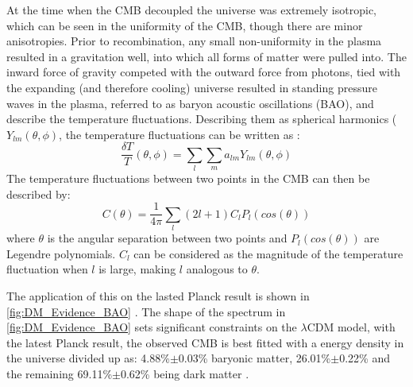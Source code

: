 \par
At the time when the CMB decoupled the universe was extremely isotropic, which can be seen in the uniformity of the CMB, though there are minor anisotropies.
Prior to recombination, any small non-uniformity in the plasma resulted in a gravitation well, into which all forms of matter were pulled into.
The inward force of gravity competed with the outward force from photons, tied with the expanding (and therefore cooling) universe resulted in standing pressure waves in the plasma, referred to as baryon acoustic oscillations (BAO), and describe the temperature fluctuations.
Describing them as spherical harmonics ($Y_{lm}(\theta,\phi)$, the temperature fluctuations can be written as \cite{History_Of_Dark_Matter_2018_ref}:
\begin{equation}
    \frac{\delta T}{T}(\theta, \phi) = \sum_{l} \sum_{m} a_{lm}Y_{lm}(\theta,\phi)
    \label{eq:bao_spherical_harmonics}
\end{equation}
The temperature fluctuations between two points in the CMB can then be described by:
\begin{equation}
    C(\theta) = \frac{1}{4\pi} \sum_{l} (2l + 1) C_l P_l (cos(\theta))
\end{equation}
where $\theta$ is the angular separation between two points and $P_l (cos(\theta))$ are Legendre polynomials.
$C_l$ can be considered as the magnitude of the temperature fluctuation when $l$ is large, making $l$ analogous to $\theta$.
\par
The application of this on the lasted Planck result is shown in \autoref{fig:DM_Evidence_BAO} \cite{plank_result_ref}.
The shape of the spectrum in \autoref{fig:DM_Evidence_BAO} sets significant constraints on the $\lambda$CDM model, with the latest Planck result, the observed CMB is best fitted with a energy density in the universe divided up as: 4.88\%$\pm$0.03\% baryonic matter, 26.01\%$\pm$0.22\% and the remaining 69.11\%$\pm$0.62\% being dark matter \cite{plank_result_ref}.

